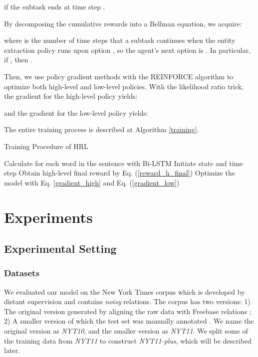 \documentclass[letterpaper]{article} \usepackage{aaai19}  \usepackage{times}  \usepackage{helvet}  \usepackage{courier}  \usepackage{url}  \usepackage{graphicx}  \frenchspacing  \setlength{\pdfpagewidth}{8.5in}  \setlength{\pdfpageheight}{11in}  \usepackage{amsfonts}
\theoremstyle{definition}
\begin{document}
if the subtask ends at time step .

By decomposing the cumulative rewards into a Bellman equation, we acquire:

where  is the number of time steps that a subtask continues when the entity extraction policy runs upon option 
, so the agent's next option is . In particular, if , then .

Then, we use policy gradient methods \cite{sutton2000policy} with the REINFORCE algorithm \cite{williams1992simple} to optimize both high-level and low-level policies. 
With the likelihood ratio trick, the gradient for the high-level policy yields:

and the gradient for the low-level policy yields: 




The entire training process is described at Algorithm \ref{training}.

\begin{algorithm}[!htb]
\small
\caption{Training Procedure of HRL}
\label{training}
Calculate  for each word in the sentence with Bi-LSTM \;
Initiate state  and time step \;
Obtain high-level final reward  by Eq. (\ref{reward_h_final})\;
Optimize the model with Eq. \ref{gradient_high} and Eq. (\ref{gradient_low})\;
\end{algorithm}

\section{Experiments}

\subsection{Experimental Setting}
\subsubsection{Datasets}
We evaluated our model on the New York Times corpus which is developed by distant supervision and contains \textit{noisy} relations. The corpus has two versions: 1) The original version generated by aligning the raw data with Freebase relations \cite{riedel2010modeling}; 2) A smaller version of which the test set was manually annotated \cite{hoffmann2011knowledge}. We name the original version as {\it NYT10}, and the smaller version as {\it NYT11}. We split some of the training data from \textit{NYT11} to construct \textit{NYT11-plus}, which will be described later.
\end{document}
